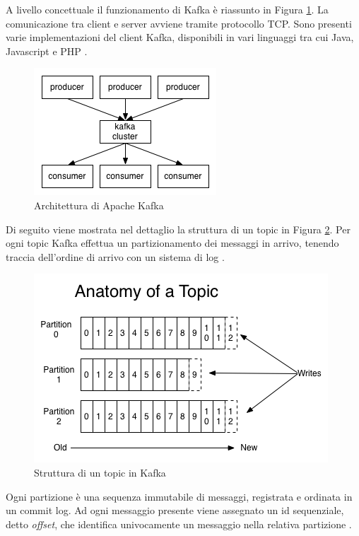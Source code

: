 \documentclass[11pt]{article}
\begin{document}
A livello concettuale il funzionamento di Kafka è riassunto in Figura \ref{kafka}. La comunicazione tra client e server avviene tramite protocollo TCP. Sono presenti varie implementazioni del client Kafka, disponibili in vari linguaggi tra cui Java, Javascript e PHP \cite{kafka}. 

\begin{figure}[H]
	\centering
	\includegraphics[scale=0.80]{images/kafka.png}
	\caption{Architettura di Apache Kafka \cite{kafka}}
	\label{kafka}
\end{figure}


Di seguito viene mostrata nel dettaglio la struttura di un topic in Figura \ref{kafka-topic}. Per ogni topic Kafka effettua un partizionamento dei messaggi in arrivo, tenendo traccia dell'ordine di arrivo con un sistema di log \cite{kafka}. 

\begin{figure}[H]
	\centering
	\includegraphics[scale=0.80]{images/log_anatomy.png}
	\caption{Struttura di un topic in Kafka \cite{kafka}}
	\label{kafka-topic}
\end{figure}

Ogni partizione è una sequenza immutabile di messaggi, registrata e ordinata in un commit log. Ad ogni messaggio presente viene assegnato un id sequenziale, detto \textit{offset}, che identifica univocamente un messaggio nella relativa partizione \cite{kafka}.
\end{document}
